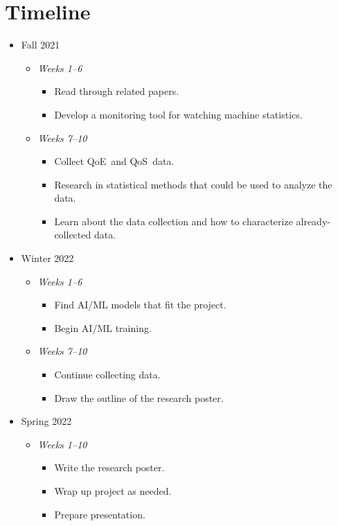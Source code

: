 \section{Timeline}\label{timeline}
\begin{itemize}
    \item Fall 2021 \begin{itemize}
        \item \emph{Weeks 1--6} \begin{itemize}
            \item Read through related papers.
            \item Develop a monitoring tool for watching machine statistics.
        \end{itemize}
        \item \emph{Weeks 7--10} \begin{itemize}
            \item Collect QoE~and QoS~data.
            \item Research in statistical methods that could be used to analyze the data.
            \item Learn about the data collection and how to characterize already-collected data.
        \end{itemize}
    \end{itemize}

    \item Winter 2022 \begin{itemize}
        \item \emph{Weeks 1--6} \begin{itemize}
            \item Find AI/ML models that fit the project.
            \item Begin AI/ML training.
        \end{itemize}
        \item \emph{Weeks 7--10} \begin{itemize}
            \item Continue collecting data.
            \item Draw the outline of the research poster.
        \end{itemize}
    \end{itemize}


    \item Spring 2022 \begin{itemize}
        \item \emph{Weeks 1--10} \begin{itemize}
            \item Write the research poster.
            \item Wrap up project as needed.
            \item Prepare presentation.
        \end{itemize}
    \end{itemize}
\end{itemize}
